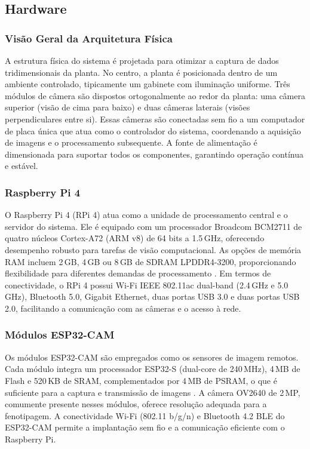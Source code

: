 \documentclass[12pt, a4paper]{article}
\begin{document}
	\subsection{Hardware}
	\subsubsection{Visão Geral da Arquitetura Física}
	A estrutura física do sistema é projetada para otimizar a captura de dados tridimensionais da planta. No centro, a planta é posicionada dentro de um ambiente controlado, tipicamente um gabinete com iluminação uniforme. Três módulos de câmera são dispostos ortogonalmente ao redor da planta: uma câmera superior (visão de cima para baixo) e duas câmeras laterais (visões perpendiculares entre si). Essas câmeras são conectadas sem fio a um computador de placa única que atua como o controlador do sistema, coordenando a aquisição de imagens e o processamento subsequente. A fonte de alimentação é dimensionada para suportar todos os componentes, garantindo operação contínua e estável.
	
	\subsubsection{Raspberry Pi 4}
	O Raspberry Pi 4 (RPi 4) atua como a unidade de processamento central e o servidor do sistema. Ele é equipado com um processador Broadcom BCM2711 de quatro núcleos Cortex-A72 (ARM v8) de 64 bits a 1.5\,GHz, oferecendo desempenho robusto para tarefas de visão computacional. As opções de memória RAM incluem 2\,GB, 4\,GB ou 8\,GB de SDRAM LPDDR4-3200, proporcionando flexibilidade para diferentes demandas de processamento \cite{RaspberryPi4Specs}. Em termos de conectividade, o RPi 4 possui Wi-Fi IEEE 802.11ac dual-band (2.4\,GHz e 5.0\,GHz), Bluetooth 5.0, Gigabit Ethernet, duas portas USB 3.0 e duas portas USB 2.0, facilitando a comunicação com as câmeras e o acesso à rede.
	
	\subsubsection{Módulos ESP32-CAM}
	Os módulos ESP32-CAM são empregados como os sensores de imagem remotos. Cada módulo integra um processador ESP32-S (dual-core de 240\,MHz), 4\,MB de Flash e 520\,KB de SRAM, complementados por 4\,MB de PSRAM, o que é suficiente para a captura e transmissão de imagens \cite{ESP32CAMSpecs}. A câmera OV2640 de 2\,MP, comumente presente nesses módulos, oferece resolução adequada para a fenotipagem. A conectividade Wi-Fi (802.11 b/g/n) e Bluetooth 4.2 BLE do ESP32-CAM permite a implantação sem fio e a comunicação eficiente com o Raspberry Pi.
	
\end{document}
